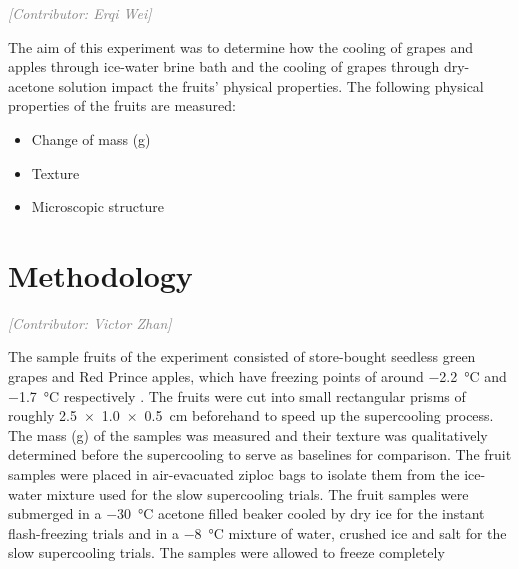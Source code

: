 \documentclass[12pt, a4paper]{article}
\newcommand{\contributor}[1]{\vspace{4pt}\noindent\textcolor{gray}{\small\textit{[Contributor: #1]}}\vspace{2pt}}
\begin{document}
\contributor{Erqi Wei}

The aim of this experiment was to determine how the cooling of grapes
and apples through ice-water brine bath and the cooling of grapes
through dry-acetone solution impact the fruits' physical properties. The
following physical properties of the fruits are measured:

\begin{itemize}
\item Change of mass (g)
\item Texture
\item Microscopic structure
\end{itemize}

\section{Methodology}


\contributor{Victor Zhan}

The sample fruits of the experiment consisted of store-bought seedless
green grapes and Red Prince apples, which have freezing points of around
$-$2.2~°C and $-$1.7~°C respectively \cite{zhao2025, wflo2018}. The
fruits were cut into small rectangular prisms of roughly 2.5~$\times$~1.0~$\times$~0.5~cm
beforehand to speed up the supercooling process. The mass (g) of the
samples was measured and their texture was qualitatively determined
before the supercooling to serve as baselines for comparison. The fruit
samples were placed in air-evacuated ziploc bags to isolate them from
the ice-water mixture used for the slow supercooling trials. The fruit
samples were submerged in a $-$30~°C acetone filled beaker cooled by dry
ice for the instant flash-freezing trials and in a $-$8~°C mixture of
water, crushed ice and salt for the slow supercooling trials. The
samples were allowed to freeze completely
\end{document}
